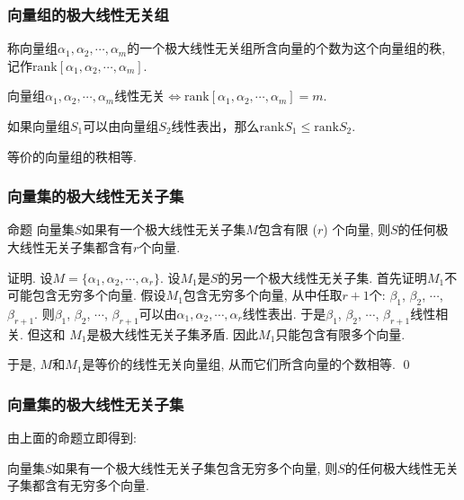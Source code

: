 \documentclass[CJK]{beamer}
\begin{document}
\begin{frame}
	\frametitle{向量组的极大线性无关组} \pause
	\begin{definition}
		称向量组$\alpha_{1}, \alpha_{2}, \cdots, \alpha_{m}$的一个极大线性无关组所含向量的个数为这个向量组的秩, 记作$\mathrm{rank}[\alpha_{1}, \alpha_{2}, \cdots, \alpha_{m}]$.
	\end{definition} \pause
	
	\begin{theorem}
		向量组$\alpha_{1}, \alpha_{2}, \cdots, \alpha_{m}$线性无关$\Longleftrightarrow\mathrm{rank}[\alpha_{1}, \alpha_{2}, \cdots, \alpha_{m}]=m$. \pause
	\end{theorem}
	
	\begin{theorem}
		如果向量组$S_{1}$可以由向量组$S_{2}$线性表出，那么$\mathrm{rank}S_{1}\leqslant\mathrm{rank}S_{2}$. \pause
	\end{theorem}
	
	\begin{corollary}
		等价的向量组的秩相等.
	\end{corollary}
\end{frame}

\begin{frame}
	\frametitle{向量集的极大线性无关子集} \pause
	\begin{block}{命题}
		向量集$S$如果有一个极大线性无关子集$M$包含有限 ($r$) 个向量, 则$S$的任何极大线性无关子集都含有$r$个向量. 
	\end{block} \pause

\vspace{0.3cm}

证明. 设$M=\{\alpha_{1}, \alpha_{2}, \cdots, \alpha_{r}\}$. 设$M_{1}$是$S$的另一个极大线性无关子集. 首先证明$M_{1}$不可能包含无穷多个向量. \pause 假设$M_{1}$包含无穷多个向量, 从中任取$r+1$个: $\beta_{1}$, $\beta_{2}$, $\cdots$, $\beta_{r+1}$. \pause 则$\beta_{1}$, $\beta_{2}$, $\cdots$, $\beta_{r+1}$可以由$\alpha_{1}, \alpha_{2}, \cdots, \alpha_{r}$线性表出. \pause 于是$\beta_{1}$, $\beta_{2}$, $\cdots$, $\beta_{r+1}$线性相关. \pause 但这和 $M_{1}$是极大线性无关子集矛盾. 因此$M_{1}$只能包含有限多个向量. \pause

于是, $M$和$M_{1}$是等价的线性无关向量组, 从而它们所含向量的个数相等. \qed

\end{frame}

\begin{frame}
	\frametitle{向量集的极大线性无关子集} \pause
	由上面的命题立即得到:
	
\begin{corollary}
	向量集$S$如果有一个极大线性无关子集包含无穷多个向量, 则$S$的任何极大线性无关子集都含有无穷多个向量.
\end{corollary}
\end{frame}
\end{document}
